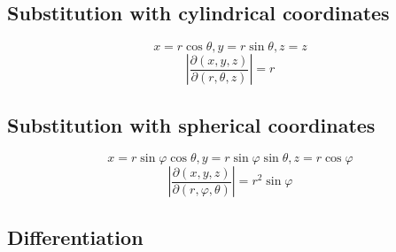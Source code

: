 	\subsection{Substitution with cylindrical coordinates}
	$$x=r\cos\theta,y=r\sin\theta,z=z$$
	$$\left|\frac{\partial(x,y,z)}{\partial(r,\theta,z)}\right|=r$$
	\subsection{Substitution with spherical coordinates}
	$$x=r\sin\varphi\cos\theta,y=r\sin\varphi\sin\theta,z=r\cos\varphi$$
	$$\left|\frac{\partial(x,y,z)}{\partial(r,\varphi,\theta)}\right|=r^2\sin\varphi$$

\subsection{Differentiation}
	\def\sinh{\mathop{\rm sinh}\nolimits}
	\def\cosh{\mathop{\rm cosh}\nolimits}
	\def\sech{\mathop{\rm sech}\nolimits}
	\def\csch{\mathop{\rm csch}\nolimits}
	\def\coth{\mathop{\rm coth}\nolimits}
	\def\tanh{\mathop{\rm tanh}\nolimits}

